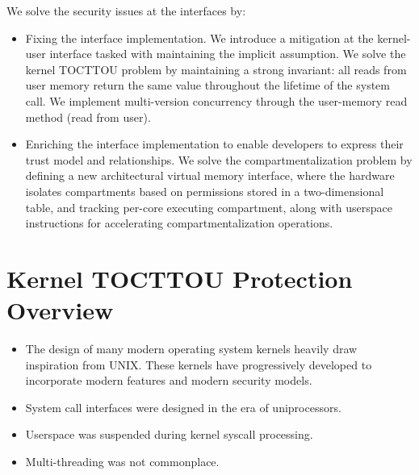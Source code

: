We solve the security issues at the interfaces by:
\begin{itemize}
  \item Fixing the interface implementation. 
        We introduce a mitigation at the kernel-user interface tasked with maintaining
        the implicit assumption.
        We solve the kernel TOCTTOU problem by maintaining a strong invariant:
        all reads from user memory return the same value throughout the lifetime of the system call.
        We implement multi-version concurrency through the user-memory read method (read from user).
  \item Enriching the interface implementation to enable developers to express their
        trust model and relationships. 
        We solve the compartmentalization problem by defining a new architectural virtual memory
        interface, where the hardware isolates compartments based on permissions stored in a 
        two-dimensional table, and tracking per-core executing compartment, along with 
        userspace instructions for accelerating compartmentalization operations.
\end{itemize}
\section{Kernel TOCTTOU Protection Overview}

\begin{itemize}
  \item The design of many modern operating system kernels heavily draw inspiration from UNIX.
        These kernels have progressively developed to incorporate modern features and modern
        security models.
  \item System call interfaces were designed in the era of uniprocessors.
  \item Userspace was suspended during kernel syscall processing.
  \item Multi-threading was not commonplace.
\end{itemize}

